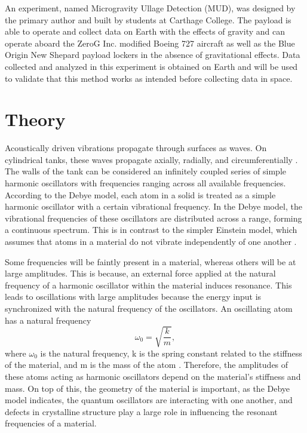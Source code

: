 \documentclass[reprint,amsmath,amssymb,aps,prb,nofootinbib,floatfix]{revtex4-2}
\begin{document}
An experiment, named Microgravity Ullage Detection (MUD), was designed by the primary author and built by students at Carthage College. The payload is able to operate and collect data on Earth with the effects of gravity and can operate aboard the ZeroG Inc. modified Boeing 727 aircraft as well as the Blue Origin New Shepard payload lockers in the absence of gravitational effects. Data collected and analyzed in this experiment is obtained on Earth and will be used to validate that this method works as intended before collecting data in space. 

\section{Theory}
Acoustically driven vibrations propagate through surfaces as waves. On cylindrical tanks, these waves propagate axially, radially, and circumferentially \cite{ChambersCylinderModes}. The walls of the tank can be considered an infinitely coupled series of simple harmonic oscillators with frequencies ranging across all available frequencies. According to the Debye model, each atom in a solid is treated as a simple harmonic oscillator with a certain vibrational frequency. In the Debye model, the vibrational frequencies of these oscillators are distributed across a range, forming a continuous spectrum. This is in contrast to the simpler Einstein model, which assumes that atoms in a material do not vibrate independently of one another \cite{OxfordSolidState}.

Some frequencies will be faintly present in a material, whereas others will be at large amplitudes. This is because, an external force applied at the natural frequency of a harmonic oscillator within the material induces resonance. This leads to oscillations with large amplitudes because the energy input is synchronized with the natural frequency of the oscillators. An oscillating atom has a natural frequency
\begin{equation}
    \omega_0 = \sqrt{\frac{k}{m}},
\end{equation}
where $\omega_0$ is the natural frequency, k is the spring constant related to the stiffness of the material, and m is the mass of the atom \cite{OscillatorBasics}. Therefore, the amplitudes of these atoms acting as harmonic oscillators depend on the material's stiffness and mass. On top of this, the geometry of the material is important, as the Debye model indicates, the quantum oscillators are interacting with one another, and defects in crystalline structure play a large role in influencing the resonant frequencies of a material.
\end{document}
